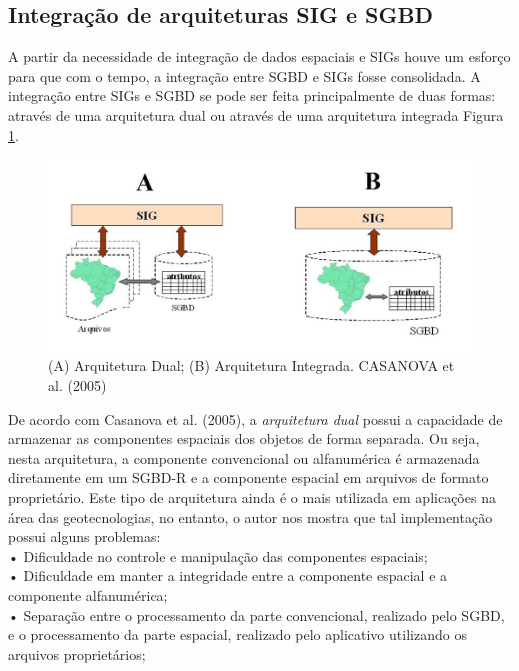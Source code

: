 		\subsection{Integração de arquiteturas SIG e SGBD}
		
		A partir da necessidade de integração de dados espaciais e SIGs houve um esforço para que com o tempo, a integração entre SGBD e SIGs fosse consolidada. A integração entre SIGs e SGBD se pode ser feita principalmente de duas formas: através de uma arquitetura dual ou através de uma arquitetura integrada Figura \ref{fig:arquiteturaduaintegrada}.
		
		\begin{figure}
			\centering
			\includegraphics[width=1\linewidth]{data/arquitetura_dua_integrada}
			\caption{(A) Arquitetura Dual; (B) Arquitetura Integrada. CASANOVA et al. (2005)}
			\label{fig:arquiteturaduaintegrada}
		\end{figure}
		
		De acordo com Casanova et al. (2005)\cite{CASANOVA_etal05}, a \textit{arquitetura dual} possui a capacidade de armazenar as componentes espaciais dos objetos de forma separada. Ou seja, nesta arquitetura, a componente convencional ou alfanumérica é armazenada diretamente em um SGBD-R e a componente espacial em arquivos de formato proprietário. Este tipo de arquitetura ainda é o mais utilizada em aplicações na área das geotecnologias, no entanto, o autor nos mostra que tal implementação possui alguns problemas: \\
		

			•	Dificuldade no controle e manipulação das componentes
						espaciais; \\
						
			•	Dificuldade em manter a integridade entre a componente espacial
						e a componente alfanumérica; \\
						
			•	Separação entre o processamento da parte convencional, realizado
						pelo SGBD, e o processamento da parte espacial, realizado pelo
						aplicativo utilizando os arquivos proprietários; \\
						
